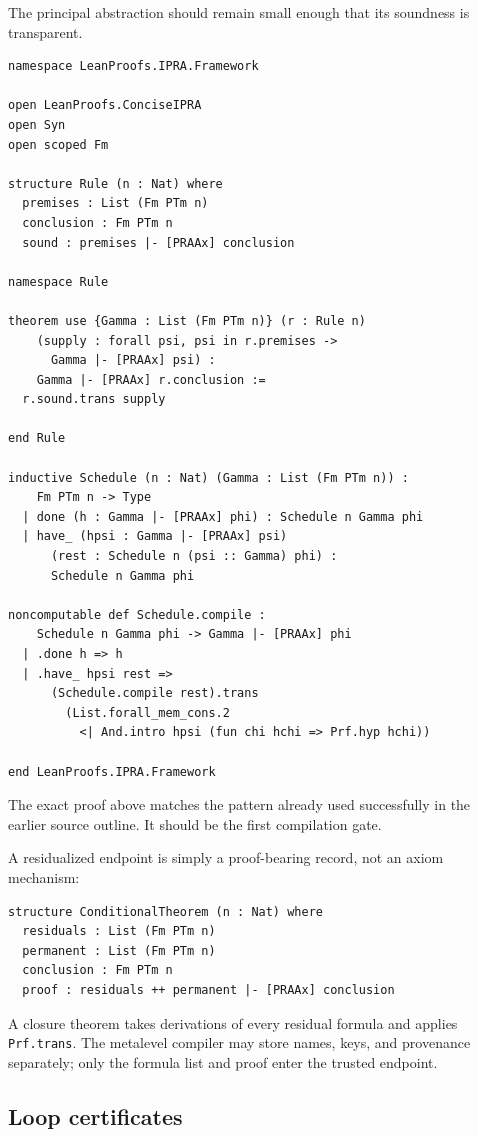 The principal abstraction should remain small enough that its soundness is transparent.

\begin{lstlisting}
namespace LeanProofs.IPRA.Framework

open LeanProofs.ConciseIPRA
open Syn
open scoped Fm

structure Rule (n : Nat) where
  premises : List (Fm PTm n)
  conclusion : Fm PTm n
  sound : premises |- [PRAAx] conclusion

namespace Rule

theorem use {Gamma : List (Fm PTm n)} (r : Rule n)
    (supply : forall psi, psi in r.premises ->
      Gamma |- [PRAAx] psi) :
    Gamma |- [PRAAx] r.conclusion :=
  r.sound.trans supply

end Rule

inductive Schedule (n : Nat) (Gamma : List (Fm PTm n)) :
    Fm PTm n -> Type
  | done (h : Gamma |- [PRAAx] phi) : Schedule n Gamma phi
  | have_ (hpsi : Gamma |- [PRAAx] psi)
      (rest : Schedule n (psi :: Gamma) phi) :
      Schedule n Gamma phi

noncomputable def Schedule.compile :
    Schedule n Gamma phi -> Gamma |- [PRAAx] phi
  | .done h => h
  | .have_ hpsi rest =>
      (Schedule.compile rest).trans
        (List.forall_mem_cons.2
          <| And.intro hpsi (fun chi hchi => Prf.hyp hchi))

end LeanProofs.IPRA.Framework
\end{lstlisting}
The exact proof above matches the pattern already used successfully in the earlier source outline.  It should be the first compilation gate.

A residualized endpoint is simply a proof-bearing record, not an axiom mechanism:

\begin{lstlisting}
structure ConditionalTheorem (n : Nat) where
  residuals : List (Fm PTm n)
  permanent : List (Fm PTm n)
  conclusion : Fm PTm n
  proof : residuals ++ permanent |- [PRAAx] conclusion
\end{lstlisting}
A closure theorem takes derivations of every residual formula and applies \texttt{Prf.trans}.  The metalevel compiler may store names, keys, and provenance separately; only the formula list and proof enter the trusted endpoint.

\subsection{Loop certificates}

